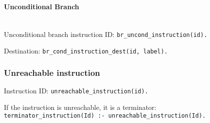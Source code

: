 \paragraph{Unconditional Branch}
~\\\noindent Unconditional branch instruction ID:
\texttt{br\_uncond\_instruction(id).}

\noindent Destination:
\texttt{br\_cond\_instruction\_dest(id, label).}

\subsubsection{Unreachable instruction}
Instruction ID:
\texttt{unreachable\_instruction(id).}

\noindent If the instruction is unreachable, it is a terminator:\\
\tab \texttt{terminator\_instruction(Id) :- unreachable\_instruction(Id).}
